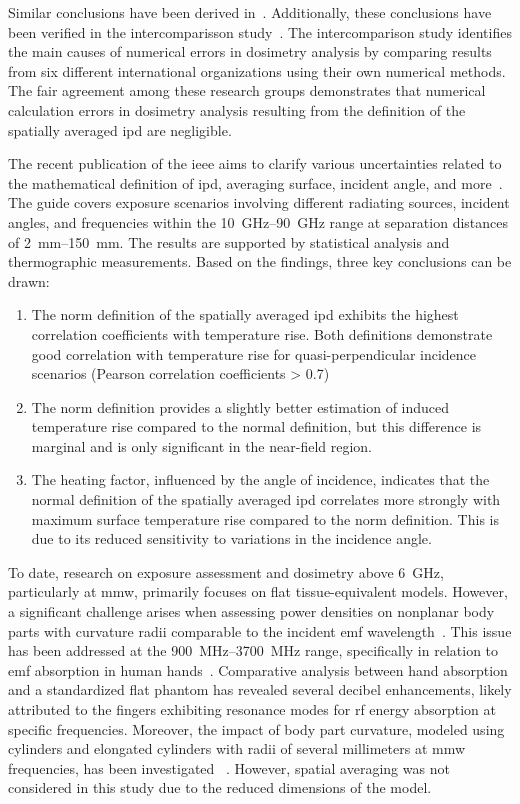 Similar conclusions have been derived in~\cite{DeSantis2022On}.
Additionally, these conclusions have been verified in the intercomparisson study~\cite{Li2021Intercomparison}.
The intercomparison study identifies the main causes of numerical errors in dosimetry analysis by comparing results from six different international organizations using their own numerical methods.
The fair agreement among these research groups demonstrates that numerical calculation errors in dosimetry analysis resulting from the definition of the spatially averaged \gls{ipd} are negligible.

The recent publication of the \gls{ieee} aims to clarify various uncertainties related to the mathematical definition of \gls{ipd}, averaging surface, incident angle, and more~\cite{IEEE2021Guide}.
The guide covers exposure scenarios involving different radiating sources, incident angles, and frequencies within the \SIrange{10}{90}{\GHz} range at separation distances of \SIrange{2}{150}{\mm}.
The results are supported by statistical analysis and thermographic measurements.
Based on the findings, three key conclusions can be drawn:
\begin{enumerate}
    \item The norm definition of the spatially averaged \gls{ipd} exhibits the highest correlation coefficients with temperature rise. Both definitions demonstrate good correlation with temperature rise for quasi-perpendicular incidence scenarios (Pearson correlation coefficients > 0.7)
    \item The norm definition provides a slightly better estimation of induced temperature rise compared to the normal definition, but this difference is marginal and is only significant in the near-field region.
    \item The heating factor, influenced by the angle of incidence, indicates that the normal definition of the spatially averaged \gls{ipd} correlates more strongly with maximum surface temperature rise compared to the norm definition. This is due to its reduced sensitivity to variations in the incidence angle.
\end{enumerate}

To date, research on exposure assessment and dosimetry above \SI{6}{\GHz}, particularly at \gls{mmw}, primarily focuses on flat tissue-equivalent models.
However, a significant challenge arises when assessing power densities on nonplanar body parts with curvature radii comparable to the incident \gls{emf} wavelength~\cite{Sacco2022Exposure}.
This issue has been addressed at the \SIrange{900}{3700}{\MHz} range, specifically in relation to \gls{emf} absorption in human hands~\cite{Li2012Mechanisms}.
Comparative analysis between hand absorption and a standardized flat phantom has revealed several decibel enhancements, likely attributed to the fingers exhibiting resonance modes for \gls{rf} energy absorption at specific frequencies.
Moreover, the impact of body part curvature, modeled using cylinders and elongated cylinders with radii of several millimeters at \gls{mmw} frequencies, has been investigated ~\cite{Sacco2022Exposure}.
However, spatial averaging was not considered in this study due to the reduced dimensions of the model.

